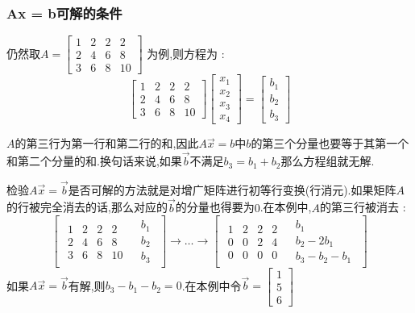 \documentclass[UTF8,12pt]{ctexbook}
\newcommand{\mediumBigCase}[1]{\left[#1\right]}
\newcommand{\augmentedMatrix}[2]{
  \mediumBigCase{
    \begin{array}{c|c}
      #1 & #2
    \end{array}
    }
    }
\begin{document}
{{{{\subsubsection{Ax = b可解的条件}{
  仍然取$A = \begin{bmatrix}
      1 & 2 & 2 & 2  \\
      2 & 4 & 6 & 8  \\
      3 & 6 & 8 & 10
    \end{bmatrix}$
  为例,则方程为 : $$
    \begin{bmatrix}
      1 & 2 & 2 & 2  \\
      2 & 4 & 6 & 8  \\
      3 & 6 & 8 & 10
    \end{bmatrix}
    \begin{bmatrix}
      x_1 \\
      x_2 \\
      x_3 \\
      x_4
    \end{bmatrix}
    =
    \begin{bmatrix}
      b_1 \\
      b_2 \\
      b_3
    \end{bmatrix}
  $$

  $A$的第三行为第一行和第二行的和,因此$A\vec{x} = b$中$b$的第三个分量也要等于其第一个和第二个分量的和.换句话来说,如果$\vec{b}$不满足$b_3 = b_1 + b_2$那么方程组就无解.

  检验$A\vec{x} = \vec{b}$是否可解的方法就是对增广矩阵进行初等行变换(行消元).如果矩阵$A$的行被完全消去的话,那么对应的$\vec{b}$的分量也得要为$0$.在本例中,$A$的第三行被消去 : $$
    \augmentedMatrix{\begin{matrix}
        1 & 2 & 2 & 2  \\
        2 & 4 & 6 & 8  \\
        3 & 6 & 8 & 10
      \end{matrix}}{\begin{matrix}
        b_1 \\
        b_2 \\
        b_3
      \end{matrix}}
    \to
    \dots
    \to
    \augmentedMatrix{\begin{matrix}
        1 & 2 & 2 & 2 \\
        0 & 0 & 2 & 4 \\
        0 & 0 & 0 & 0
      \end{matrix}}{\begin{matrix}
        b_1        \\
        b_2 - 2b_1 \\
        b_3 - b_2 - b_1
      \end{matrix}}
  $$
  如果$A\vec{x} = \vec{b}$有解,则$b_3 - b_1 - b_2 = 0$.在本例中令$\vec{b} = \begin{bmatrix}
      1 \\
      5 \\
      6
    \end{bmatrix}$

}}}}}
\end{document}
